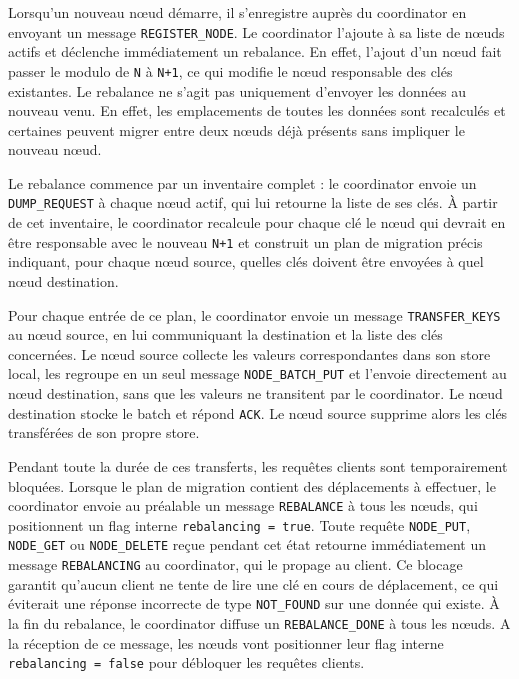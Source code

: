 Lorsqu'un nouveau nœud démarre, il s'enregistre auprès du coordinator en envoyant un message \texttt{REGISTER\_NODE}. Le coordinator l'ajoute à sa liste de nœuds actifs et déclenche immédiatement un rebalance. En effet, l'ajout d'un nœud fait passer le modulo de \texttt{N} à \texttt{N+1}, ce qui modifie le nœud responsable des clés existantes. Le rebalance ne s'agit pas uniquement d’envoyer les données au nouveau venu. En effet, les emplacements de toutes les données sont recalculés et certaines peuvent migrer entre deux nœuds déjà présents sans impliquer le nouveau nœud.

Le rebalance commence par un inventaire complet : le coordinator envoie un \texttt{DUMP\_REQUEST} à chaque nœud actif, qui lui retourne la liste de ses clés. À partir de cet inventaire, le coordinator recalcule pour chaque clé le nœud qui devrait en être responsable avec le nouveau \texttt{N+1} et construit un plan de migration précis indiquant, pour chaque nœud source, quelles clés doivent être envoyées à quel nœud destination.

Pour chaque entrée de ce plan, le coordinator envoie un message \texttt{TRANSFER\_KEYS} au nœud source, en lui communiquant la destination et la liste des clés concernées. Le nœud source collecte les valeurs correspondantes dans son store local, les regroupe en un seul message \texttt{NODE\_BATCH\_PUT} et l'envoie directement au nœud destination, sans que les valeurs ne transitent par le coordinator. Le nœud destination stocke le batch et répond \texttt{ACK}. Le nœud source supprime alors les clés transférées de son propre store.

Pendant toute la durée de ces transferts, les requêtes clients sont temporairement bloquées. Lorsque le plan de migration contient des déplacements à effectuer, le coordinator envoie au préalable un message \texttt{REBALANCE} à tous les nœuds, qui positionnent un flag interne \texttt{rebalancing = true}. Toute requête \texttt{NODE\_PUT}, \texttt{NODE\_GET} ou \texttt{NODE\_DELETE} reçue pendant cet état retourne immédiatement un message \texttt{REBALANCING} au coordinator, qui le propage au client. Ce blocage garantit qu'aucun client ne tente de lire une clé en cours de déplacement, ce qui éviterait une réponse incorrecte de type \texttt{NOT\_FOUND} sur une donnée qui existe. À la fin du rebalance, le coordinator diffuse un \texttt{REBALANCE\_DONE} à tous les nœuds. A la réception de ce message, les nœuds vont positionner leur flag interne \texttt{rebalancing = false} pour débloquer les requêtes clients.

